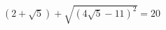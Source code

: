 \begin{ex}[type=chek_eq]
	\begin{condition}
		\( (2+\sqrt{5})+\sqrt{(4\sqrt{5}-11)^2}=20 \)
	\end{condition}
\end{ex}